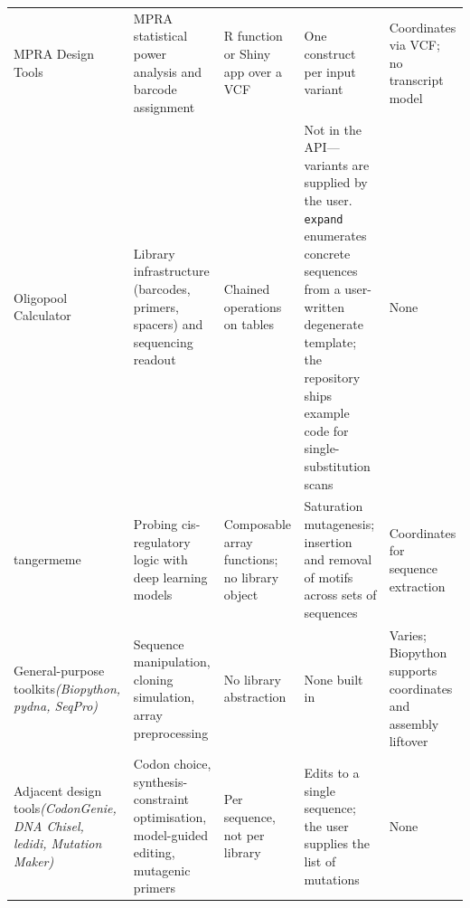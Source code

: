 \begin{table}[t]
\begin{tabular}{@{}p{2.0cm}p{2.45cm}p{3.1cm}p{3.6cm}p{3.05cm}@{}}
MPRA Design Tools &
MPRA statistical power analysis and barcode assignment &
R function or Shiny app over a VCF &
One construct per input variant &
Coordinates via VCF; no transcript model \\
\addlinespace

Oligopool Calculator &
Library infrastructure (barcodes, primers, spacers) and sequencing readout &
Chained operations on tables &
Not in the API---variants are supplied by the user. \texttt{expand} enumerates
concrete sequences from a user-written degenerate template; the repository ships
example code for single-substitution scans &
None \\
\addlinespace

tangermeme &
Probing cis-regulatory logic with deep learning models &
Composable array functions; no library object &
Saturation mutagenesis; insertion and removal of motifs across sets of sequences &
Coordinates for sequence extraction \\
\addlinespace

General-purpose toolkits\newline\textit{(Biopython, pydna, SeqPro)} &
Sequence manipulation, cloning simulation, array preprocessing &
No library abstraction &
None built in &
Varies; Biopython supports coordinates and assembly liftover \\
\addlinespace

Adjacent design tools\newline\textit{(CodonGenie, DNA Chisel, ledidi, Mutation Maker)} &
Codon choice, synthesis-constraint optimisation, model-guided editing, mutagenic
primers &
Per sequence, not per library &
Edits to a single sequence; the user supplies the list of mutations &
None \\

\bottomrule
\end{tabular}
\end{table}
